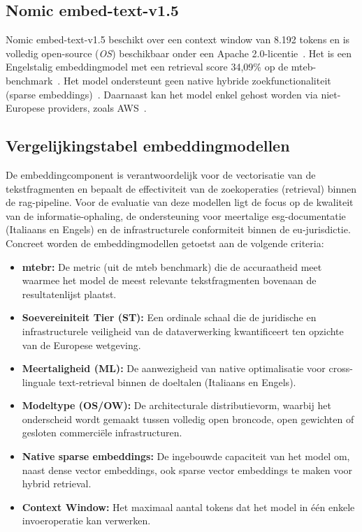 \subsection{Nomic embed-text-v1.5}

Nomic embed-text-v1.5 beschikt over een context window van 8.192 tokens en is volledig open-source (\textit{OS}) beschikbaar onder een Apache 2.0-licentie~\autocite{Nussbaum2024}. Het is een Engelstalig embeddingmodel met een retrieval score 34,09\% op de \gls{mteb}-benchmark~\autocite{MTEBzd,Nussbaum2024}. Het model ondersteunt geen native hybride zoekfunctionaliteit (sparse embeddings)~\autocite{Nussbaum2024}. Daarnaast kan het model enkel gehost worden via niet-Europese providers, zoals AWS~\autocite{NomicAIzd}. 

\subsection{Vergelijkingstabel embeddingmodellen}

De embeddingcomponent is verantwoordelijk voor de vectorisatie van de tekstfragmenten en bepaalt de effectiviteit van de zoekoperaties (retrieval) binnen de \gls{rag}-pipeline. Voor de evaluatie van deze modellen ligt de focus op de kwaliteit van de informatie-ophaling, de ondersteuning voor meertalige \gls{esg}-documentatie (Italiaans en Engels) en de infrastructurele conformiteit binnen de \gls{eu}-jurisdictie. Concreet worden de embeddingmodellen getoetst aan de volgende criteria:

\begin{itemize}
  \item \textbf{\gls{mtebr}:} De metric (uit de \gls{mteb} benchmark) die de accuraatheid meet waarmee het model de meest relevante tekstfragmenten bovenaan de resultatenlijst plaatst.
  \item \textbf{Soevereiniteit Tier (ST):} Een ordinale schaal die de juridische en infrastructurele veiligheid van de dataverwerking kwantificeert ten opzichte van de Europese wetgeving.
  \item \textbf{Meertaligheid (ML):} De aanwezigheid van native optimalisatie voor cross-linguale text-retrieval binnen de doeltalen (Italiaans en Engels).
  \item \textbf{Modeltype (OS/OW):} De architecturale distributievorm, waarbij het onderscheid wordt gemaakt tussen volledig open broncode, open gewichten of gesloten commerciële infrastructuren.
  \item \textbf{Native sparse embeddings:} De ingebouwde capaciteit van het model om, naast dense vector embeddings, ook sparse vector embeddings te maken voor hybrid retrieval.
  \item \textbf{Context Window:} Het maximaal aantal tokens dat het model in één enkele invoeroperatie kan verwerken.
\end{itemize}

